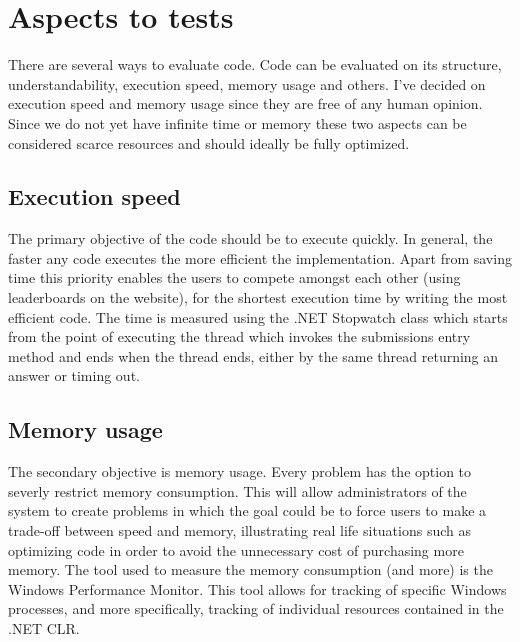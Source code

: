 \section{Aspects to tests}
There are several ways to evaluate code. Code can be evaluated on its structure, understandability, execution speed, memory usage and others. I've decided on execution speed and memory usage since they are free of any human opinion. Since we do not yet have infinite time or memory these two aspects can be considered scarce resources and should ideally be fully optimized.


\subsection{Execution speed}
The primary objective of the code should be to execute quickly. In general, the faster any code executes the more efficient the implementation. Apart from saving time this priority enables the users to compete amongst each other (using leaderboards on the website), for the shortest execution time by writing the most efficient code. 
The time is measured using the .NET Stopwatch class \cite{Stopwatch} which starts from the point of executing the thread which invokes the submissions entry method and ends when the thread ends, either by the same thread returning an answer or timing out. 


\subsection{Memory usage}
The secondary objective is memory usage. Every problem has the option to severly restrict memory consumption. This will allow administrators of the system to create problems in which the goal could be to force users to make a trade-off between speed and memory, illustrating real life situations such as optimizing code in order to avoid the unnecessary cost of purchasing more memory.
The tool used to measure the memory consumption (and more) is the Windows Performance Monitor. This tool allows for tracking of specific Windows processes, and more specifically, tracking of individual resources contained in the .NET CLR.
